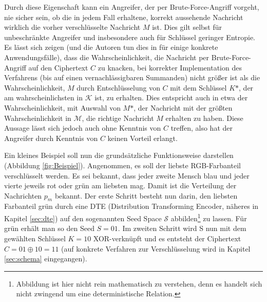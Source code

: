 Durch diese Eigenschaft kann ein Angreifer, der per Brute-Force-Angriff vorgeht, nie sicher sein, ob die in jedem Fall erhaltene, korrekt aussehende Nachricht wirklich die vorher verschlüsselte Nachricht \(M\) ist. Dies gilt selbst für unbeschränkte Angreifer und insbesondere auch für Schlüssel geringer Entropie. Es lässt sich zeigen (und die Autoren tun dies in\cite{EURO2014} für einige konkrete Anwendungsfälle), dass die Wahrscheinlichkeit, die Nachricht per Brute-Force-Angriff auf den Ciphertext \(C\) zu knacken, bei korrekter Implementation des Verfahrens (bis auf einen vernachlässigbaren Summanden) nicht größer ist als die Wahrscheinlichkeit, \(M\) durch Entschlüsselung von \(C\) mit dem Schlüssel \(K\text{*}\), der am wahrscheinlichsten in \(\mathcal{K}\) ist, zu erhalten. Dies entspricht auch in etwa der Wahrscheinlichkeit, mit Auswahl von \(M\text{*}\), der Nachricht mit der größten Wahrscheinlichkeit in \(\mathcal{M}\), die richtige Nachricht \(M\) erhalten zu haben. Diese Aussage lässt sich jedoch auch ohne Kenntnis von \(C\) treffen, also hat der Angreifer durch Kenntnis von \(C\) keinen Vorteil erlangt.

Ein kleines Beispiel soll nun die grundsätzliche Funktionsweise darstellen (Abbildung \ref{fig:Beispiel}). Angenommen, es soll der liebste RGB-Farbanteil verschlüsselt werden. Es sei bekannt, dass jeder zweite Mensch blau und jeder vierte jeweils rot oder grün am liebsten mag. Damit ist die Verteilung der Nachrichten \(p_m\) bekannt. Der erste Schritt besteht nun darin, den liebsten Farbanteil grün durch eine DTE (Distribution Transforming Encoder, näheres in Kapitel \ref{sec:dte}) auf den sogenannten Seed Space \(\mathcal{S}\) abbilden\footnote{Abbildung ist hier nicht rein mathematisch zu verstehen, denn es handelt sich nicht zwingend um eine deterministische Relation.} zu lassen. Für grün erhält man so den Seed \(S=01\). Im zweiten Schritt wird S nun mit dem gewählten Schlüssel \(K=10\) XOR-verknüpft und es entsteht der Ciphertext \(C=01 \oplus 10 = 11\) (auf konkrete Verfahren zur Verschlüsselung wird in Kapitel \ref{sec:schema} eingegangen).

